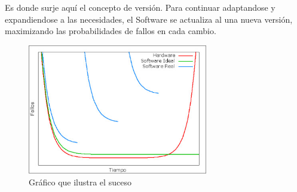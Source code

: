 \newpage

Es donde surje aquí el concepto de versión. Para continuar adaptandose y expandiendose a las necesidades, el
Software se actualiza al una nueva versión, maximizando las probabilidades de fallos en cada cambio.

\begin{figure}[h]
    \centering
    \includegraphics[width=0.7\textwidth]{assets/SoftwareFails.jpeg}
    \caption{Gráfico que ilustra el suceso}
    \label{graph:softwarefails}
\end{figure}